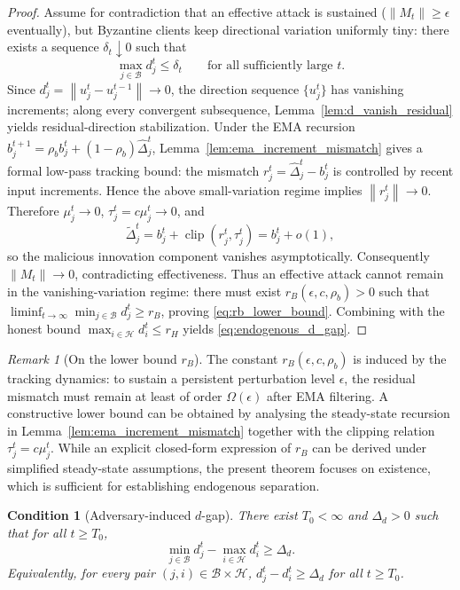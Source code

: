 \documentclass[11pt,a4paper]{article}
\newtheorem{condition}{Condition}
\theoremstyle{remark}
\newtheorem{remark}{Remark}
\newcommand{\HH}{\mathcal{H}}
\newcommand{\BB}{\mathcal{B}}
\newcommand{\clip}{\operatorname{clip}}
\newcommand{\norm}[1]{\left\lVert #1 \right\rVert}
\begin{document}
\begin{proof}
Assume for contradiction that an effective attack is sustained
(\(\norm{M_t}\ge \epsilon\) eventually), but Byzantine clients keep directional
variation uniformly tiny: there exists a sequence \(\delta_t\downarrow 0\) such
that
\[
    \max_{j\in\BB} d_j^t \le \delta_t
    \qquad\text{for all sufficiently large }t.
\]
Since \(d_j^t=\norm{u_j^t-u_j^{t-1}}\to 0\), the direction sequence
\(\{u_j^t\}\) has vanishing increments; along every convergent subsequence,
Lemma~\ref{lem:d_vanish_residual} yields residual-direction stabilization.
Under the EMA recursion
\(
b_j^{t+1}=\rho_b b_j^t+(1-\rho_b)\hat\Delta_j^t
\),
Lemma~\ref{lem:ema_increment_mismatch} gives a formal low-pass tracking bound:
the mismatch \(r_j^t=\hat\Delta_j^t-b_j^t\) is controlled by recent input
increments. Hence the above small-variation regime implies \(\norm{r_j^t}\to 0\).
Therefore \(\mu_j^t\to 0\), \(\tau_j^t=c\mu_j^t\to 0\), and
\[
    \tilde\Delta_j^t
    =
    b_j^t+\clip(r_j^t,\tau_j^t)
    =
    b_j^t+o(1),
\]
so the malicious innovation component vanishes asymptotically. Consequently
\(\norm{M_t}\to 0\), contradicting effectiveness.
Thus an effective attack cannot remain in the vanishing-variation regime:
there must exist \(r_B(\epsilon,c,\rho_b)>0\) such that
\(\liminf_{t\to\infty}\min_{j\in\BB} d_j^t\ge r_B\), proving
\eqref{eq:rb_lower_bound}. Combining with the honest bound
\(\max_{i\in\HH} d_i^t\le r_H\) yields \eqref{eq:endogenous_d_gap}.
\end{proof}

\begin{remark}[On the lower bound \(r_B\)]
\label{rem:rb_constructive}
The constant \(r_B(\epsilon,c,\rho_b)\) is induced by the tracking dynamics:
to sustain a persistent perturbation level \(\epsilon\), the residual mismatch
must remain at least of order \(\Omega(\epsilon)\) after EMA filtering.
A constructive lower bound can be obtained by analysing the steady-state
recursion in Lemma~\ref{lem:ema_increment_mismatch} together with the clipping
relation \(\tau_j^t=c\mu_j^t\).
While an explicit closed-form expression of \(r_B\) can be derived under
simplified steady-state assumptions, the present theorem focuses on existence,
which is sufficient for establishing endogenous separation.
\end{remark}

\begin{condition}[Adversary-induced \(d\)-gap]
\label{cond:d_sep}
There exist \(T_0<\infty\) and \(\Delta_d>0\) such that for all \(t\ge T_0\),
\begin{equation}
    \min_{j\in\BB} d_j^t - \max_{i\in\HH} d_i^t \ge \Delta_d.
    \label{eq:d_gap_ass}
\end{equation}
Equivalently, for every pair \((j,i)\in\BB\times\HH\),
\(d_j^t-d_i^t\ge \Delta_d\) for all \(t\ge T_0\).
\end{condition}
\end{document}
